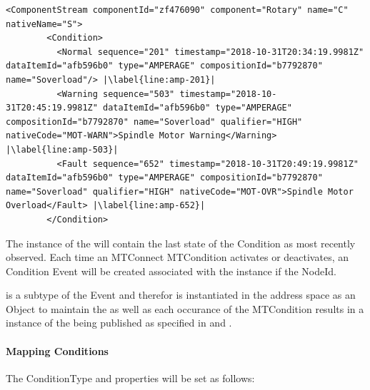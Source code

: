 \begin{lstlisting}[firstnumber=last,escapechar=|,%
    caption={Rotary C Component Stream},label={lst:rotary-component-stream}]
      <ComponentStream componentId="zf476090" component="Rotary" name="C" nativeName="S">
        <Condition>
          <Normal sequence="201" timestamp="2018-10-31T20:34:19.9981Z" dataItemId="afb596b0" type="AMPERAGE" compositionId="b7792870" name="Soverload"/> |\label{line:amp-201}|
          <Warning sequence="503" timestamp="2018-10-31T20:45:19.9981Z" dataItemId="afb596b0" type="AMPERAGE" compositionId="b7792870" name="Soverload" qualifier="HIGH" nativeCode="MOT-WARN">Spindle Motor Warning</Warning> |\label{line:amp-503}|
          <Fault sequence="652" timestamp="2018-10-31T20:49:19.9981Z" dataItemId="afb596b0" type="AMPERAGE" compositionId="b7792870" name="Soverload" qualifier="HIGH" nativeCode="MOT-OVR">Spindle Motor Overload</Fault> |\label{line:amp-652}|
        </Condition>
\end{lstlisting}

The instance of the  will contain the last state of the \gls{Condition} as most recently observed. Each time an MTConnect \gls{MTCondition} activates or deactivates, an \gls{Condition} \gls{Event} will be created associated with the instance if the  \gls{NodeId}. 

 is a subtype of the \gls{Event} and therefor is instantiated in the address space as an \gls{Object} to maintain the  as well as each occurance of the \gls{MTCondition} results in a instance of the  being published as specified in \cite{UAPart3} and \cite{UAPart9}.

\paragraph{Mapping Conditions}

The \gls{ConditionType} and  properties will be set as follows:

